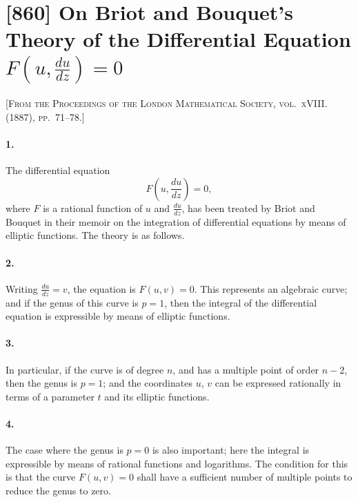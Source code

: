 \documentclass[11pt,a4paper]{book}
\begin{document}
\newpage
\section*{[860] On Briot and Bouquet's Theory of the Differential Equation $F(u, \frac{du}{dz}) = 0$}

\noindent\textsc{[From the Proceedings of the London Mathematical Society, vol.~xVIII. (1887), pp.~71--78.]}

\smallskip

\paragraph{1.} The differential equation
\[
F\left(u, \frac{du}{dz}\right) = 0,
\]
where $F$ is a rational function of $u$ and $\frac{du}{dz}$, has been treated by Briot and Bouquet in their memoir on the integration of differential equations by means of elliptic functions. The theory is as follows.

\paragraph{2.} Writing $\frac{du}{dz} = v$, the equation is $F(u, v) = 0$. This represents an algebraic curve; and if the genus of this curve is $p = 1$, then the integral of the differential equation is expressible by means of elliptic functions.

\paragraph{3.} In particular, if the curve is of degree $n$, and has a multiple point of order $n - 2$, then the genus is $p = 1$; and the coordinates $u$, $v$ can be expressed rationally in terms of a parameter $t$ and its elliptic functions.

\paragraph{4.} The case where the genus is $p = 0$ is also important; here the integral is expressible by means of rational functions and logarithms. The condition for this is that the curve $F(u, v) = 0$ shall have a sufficient number of multiple points to reduce the genus to zero.
\end{document}
